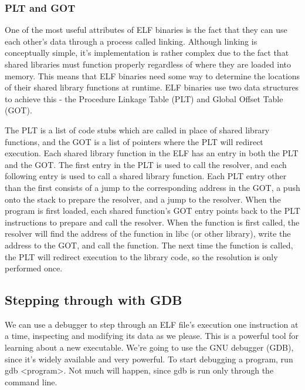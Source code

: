 \subsubsection{PLT and GOT}
One of the most useful attributes of ELF binaries is the fact that they can
use each other's data through a process called linking. Although linking is
conceptually simple, it's implementation is rather complex due to the fact that
shared libraries must function properly regardless of where they are loaded into
memory. This means that ELF binaries need some way to determine the locations of
their shared library functions at runtime. ELF binaries use two data structures
to achieve this - the Procedure Linkage Table (PLT) and Global Offset Table
(GOT).

The PLT is a list of code stubs which are called in place of shared library
functions, and the GOT is a list of pointers where the PLT will redirect
execution. Each shared library function in the ELF has an entry in both the PLT
and the GOT. The first entry in the PLT is used to call the resolver, and each
following entry is used to call a shared library function. Each PLT entry other
than the first consists of a jump to the corresponding address in the GOT, a
push onto the stack to prepare the resolver, and a jump to the resolver. When
the program is first loaded, each shared function's GOT entry points back to the
PLT instructions to prepare and call the resolver. When the function is first
called, the resolver will find the address of the function in libc (or other
library), write the address to the GOT, and call the function. The next time the
function is called, the PLT will redirect execution to the library code, so the
resolution is only performed once.

\subsection{Stepping through with GDB}
We can use a debugger to step through an ELF file's execution one instruction at
a time, inspecting and modifying its data as we please. This is a powerful tool
for learning about a new executable. We're going to use the GNU debugger (GDB),
since it's widely available and very powerful. To start debugging a program, run
gdb <program>. Not much will happen, since gdb is run only through the command
line.

